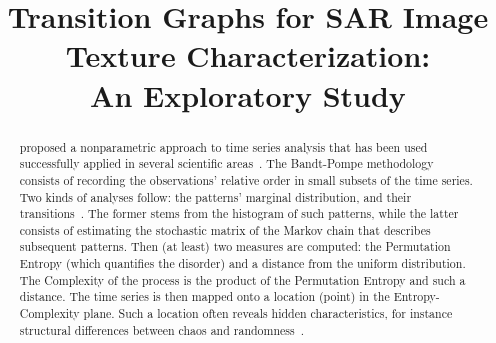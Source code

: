\documentclass{article}
\title{Transition Graphs for SAR Image Texture Characterization:\\ An Exploratory Study}
\begin{document}
\maketitle

\begin{abstract}


\citet{PermutationEntropyBandtPompe} proposed a nonparametric approach to time series analysis that has been used successfully applied in several scientific areas~\cite{baravalle2018discriminating, Araujo2019permutation, ClassificationVerificationOnlineHandwrittenSignatures}.
The Bandt-Pompe methodology consists of 
recording the observations' relative order in small subsets of the time series.
Two kinds of analyses follow: the patterns' marginal distribution, and their transitions~\cite{LearningandDistinguishingTimeSeriesDynamicsViaOrdinalPatternsTransitionGraphs2019,MultiscaleOrdinalNetworkAnalysisofHumanCardiacDynamics}.
The former stems from the histogram of such patterns, while the latter consists of estimating the stochastic matrix of the Markov chain that describes subsequent patterns.
Then (at least) two measures are computed: the Permutation Entropy (which quantifies the disorder) and a distance from the uniform distribution.
The Complexity of the process is the product of the Permutation Entropy and such a distance.
The time series is then mapped onto a location (point) in the Entropy-Complexity plane.
Such a location often reveals hidden characteristics, for instance structural differences between chaos and randomness~\cite{DistinguishingNoiseFromChaos,Rosso2007}.



\end{abstract}
\end{document}
